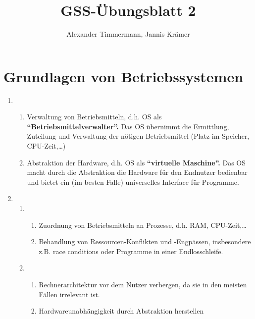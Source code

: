 \documentclass[a4paper,11pt]{scrartcl}
\author{Alexander Timmermann, Jannis Krämer}
\title{GSS-Übungsblatt 2}
\date{}
\begin{document}
\maketitle
\thispagestyle{empty}

\doublespace

\section{Grundlagen von Betriebssystemen}

\begin{enumerate}[\bf a)]
    \item
        \begin{enumerate}[1.]
            \item Verwaltung von Betriebsmitteln, d.h. OS als
                  \textbf{``Betriebsmittelverwalter''.} Das OS übernimmt die
                  Ermittlung, Zuteilung und Verwaltung der nötigen
                  Betriebsmittel (Platz im Speicher, CPU-Zeit,…)
            \item Abstraktion der Hardware, d.h. OS als
                  \textbf{``virtuelle Maschine''.} Das OS macht durch die
                  Abstraktion die Hardware für den Endnutzer bedienbar und
                  bietet ein (im besten Falle) universelles Interface für
                  Programme.
        \end{enumerate}
    \item
        \begin{enumerate}[1.]
            \item
                \begin{enumerate}[$\star$]
                    \item Zuordnung von Betriebsmitteln an Prozesse, d.h. RAM,
                          CPU-Zeit,…
                    \item Behandlung von Ressourcen-Konflikten und -Engpässen,
                          insbesondere z.B. race conditions oder Programme in
                          einer Endlosschleife.
                \end{enumerate}
            \item
                \begin{enumerate}[$\star$]
                    \item Rechnerarchitektur vor dem Nutzer verbergen, da sie in
                          den meisten Fällen irrelevant ist.
                    \item Hardwareunabhängigkeit durch Abstraktion herstellen
                \end{enumerate}
        \end{enumerate}
\end{enumerate}
\end{document}
